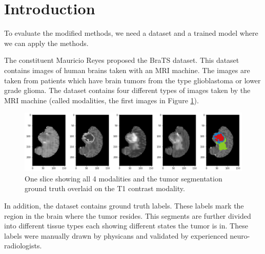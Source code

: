 \section{Introduction}
To evaluate the modified methods, we need a dataset and a trained model where we can apply the methods.

The constituent Mauricio Reyes proposed the BraTS \cite{menze2015multimodal} dataset. This dataset contains
images of human brains taken with an MRI machine. The images are taken from patients which have brain tumors from the type
glioblastoma or lower grade glioma. The dataset contains four different types of images taken by the MRI machine (called modalities, the first images in Figure \ref{brats_example}).

\begin{figure}[H]
\centering
\includegraphics[width=14cm]{chapters/04_segmentation/images/brats.png}
\caption{One slice showing all 4 modalities and the tumor segmentation ground truth overlaid on the T1 contrast modality.}
\label{brats_example}
\end{figure}

In addition, the dataset contains ground truth labels. These labels mark the region in the brain where the tumor resides.
This segments are further divided into different tissue types each showing different states the tumor is in.
These labels were manually drawn by physicans and validated by experienced neuro-radiologists.
